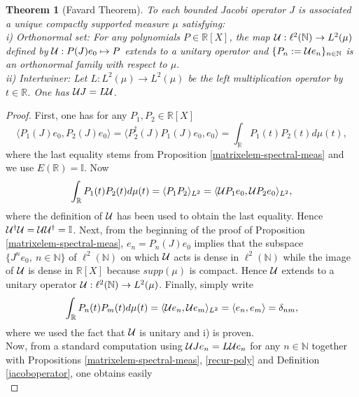 \documentclass[a4paper]{jpconf}
\numberwithin{equation}{section}
\newcommand\bbone{{ \mathbb{I}}}
\newtheorem{theorem}[Theorem]{Theorem}
\theoremstyle{nonumberplain}
\newtheorem{proof}{Proof}
\begin{document}
\begin{theorem} [Favard Theorem]\label{Favard}
To each bounded Jacobi operator $J$ is associated a unique compactly supported measure $\mu$ satisfying:\\
i) Orthonormal set:  For any polynomials $P\in\mathbb{R}[X]$, the map ${\cal{U}}:\ell^2(\mathbb{N})\to L^2(\mu)$ defined by ${\cal{U}}:P(J)e_0\mapsto P$ extends to a unitary operator and $\{P_n:={\cal{U}}e_n\}_{n\in\mathbb{N}}$ is an orthonormal family with respect to $\mu$.\\
ii) Intertwiner: Let $L:L^2(\mu)\to L^2(\mu)$ be the left multiplication operator by $t\in\mathbb{R}$. One has ${\cal{U}}J=L\cal{U}$.
\end{theorem}
\begin{proof}
First, one has for any $P_1, P_2\in\mathbb{R}[X]$ 
\begin{equation}
\langle P_1(J)e_0, P_2(J)e_0\rangle=\langle P_2^\dag(J)P_1(J)e_0, e_0\rangle=\int_\mathbb{R}P_1(t)P_2(t)d\mu(t),
\end{equation}
where the last equality stems from Proposition \ref{matrixelem-spectral-meas} and we use $E(\mathbb{R})=\bbone$. Now 
\begin{equation}
\int_\mathbb{R}P_1(t)P_2(t)d\mu(t)=\langle P_1P_2\rangle_{L^2}= \langle {\cal{U}}P_1e_0,{\cal{U}}P_2e_0\rangle_{L^2},
\end{equation}
where the definition of ${\cal{U}}$ has been used to obtain the last equality. Hence ${\cal{U}}^\dag{\cal{U}}={\cal{U}}{\cal{U}}^\dag=\bbone$. Next, from the beginning of the proof of Proposition \ref{matrixelem-spectral-meas}, $e_n=P_n(J)e_0$ implies that the subspace $\{J^ne_0,\ n\in\mathbb{N}\}$ of $\ell^2(\mathbb{N})$ on which ${\cal{U}}$ acts is dense in $\ell^2(\mathbb{N})$ while the image of ${\cal{U}}$ is dense in $\mathbb{R}[X]$ because $supp(\mu)$ is compact. Hence ${\cal{U}}$ extends to a unitary operator ${\cal{U}}:\ell^2(\mathbb{N})\to L^2(\mu)$. Finally, simply write 
\begin{equation}
\int_\mathbb{R}P_n(t)P_m(t)d\mu(t)=\langle {\cal{U}}e_n,{\cal{U}}e_m\rangle_{L^2}=\langle e_n,e_m\rangle=\delta_{nm},
\end{equation}
where we used the fact that ${\cal{U}}$ is unitary and i) is proven. \\
Now, from a standard computation using ${\cal{U}}Je_n=L{\cal{U}}e_n$ for any $n\in\mathbb{N}$ together with Propositions \ref{matrixelem-spectral-meas}, \ref{recur-poly} and Definition \ref{jacoboperator}, one obtains easily 
\begin{equation}

\end{equation}
\end{proof}
\end{document}
